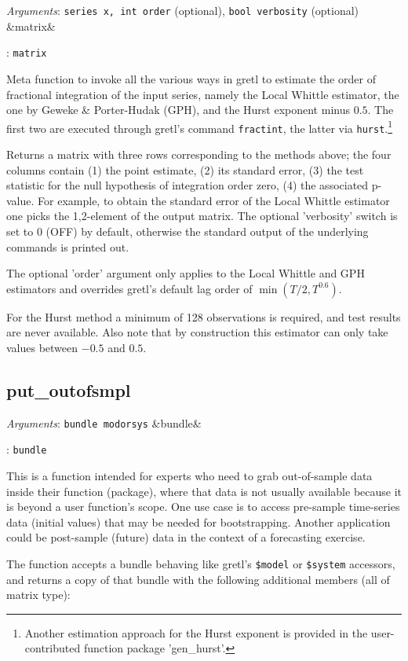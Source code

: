 \documentclass[11pt,english]{article}
\newcommand{\ArgRet}[2]{%
  {\it Arguments}: {#1}%
  \ifx&#2&%
  \else
  \par\smallskip\noindent {\it Return type}: \texttt{#2}
  \fi%
  \par\medskip\par%
  }
\begin{document}
\ArgRet{\texttt{series x, int order} (optional), \texttt{bool verbosity}
 (optional)}{matrix}

Meta function to invoke all the various ways in gretl to estimate the order of
fractional integration of the input series, namely the Local Whittle estimator,
the one by Geweke \& Porter-Hudak (GPH), and the Hurst exponent minus $0.5$.
The first two are executed through gretl's command \texttt{fractint}, the
latter via \texttt{hurst}.\footnote{Another estimation approach for the Hurst
exponent is provided in the user-contributed function package 'gen\_hurst'.}

Returns a matrix with three rows corresponding to the methods above; the four
columns contain (1) the point estimate, (2) its standard error, (3) the test
statistic for the null hypothesis of integration order zero, (4) the associated
p-value. For example, to obtain the standard error of the Local Whittle
estimator one picks the 1,2-element of the output matrix. The optional
'verbosity' switch is set to 0 (OFF) by default, otherwise the standard output
of the underlying commands is printed out.

The optional 'order' argument only applies to the Local Whittle and GPH
estimators and overrides gretl's default lag order of $\min(T/2, T^{0.6})$.

For the Hurst method a minimum of 128 observations is required, and test
results are never available. Also note that by construction this estimator can
only take values between $-0.5$ and $0.5$.

\subsection{put\_outofsmpl}

\ArgRet{\texttt{bundle modorsys}}{bundle}

This is a function intended for experts who need to grab out-of-sample data
inside their function (package), where that data is not usually available
because it is beyond a user function's scope. One use case is to access
pre-sample time-series data (initial values) that may be needed for
bootstrapping. Another application could be post-sample (future) data in the
context of a forecasting exercise. 

The function accepts a bundle behaving like gretl's \texttt{\$model} or 
\texttt{\$system} accessors, and returns a copy of that bundle with the 
following additional members (all of matrix type):
\end{document}
